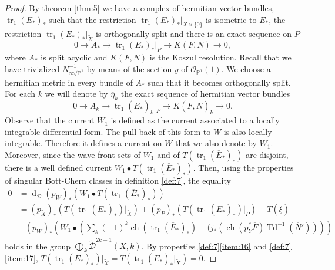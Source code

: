 \documentclass[10pt,twoside]{article}
\numberwithin{equation}{section}
\theoremstyle{plain}
\theoremstyle{definition}
\DeclareMathOperator{\tr}{tr}
\DeclareMathOperator{\Td}{Td}
\DeclareMathOperator{\dd}{d}
\DeclareMathOperator{\ch}{ch}
\begin{document}
\begin{proof}
  By theorem \ref{thm:5} we have a complex of hermitian vector
  bundles, $\tr_{1}(E_{\ast})_{\ast }$ such that the restriction $\tr_{1}(E_{\ast})_{\ast
  }|_{X\times \{0\}}$ is isometric to $E_{\ast }$, the restriction
  $\tr_{1}(E_{\ast})_{\ast 
  }|_{\widetilde X}$ is orthogonally split and there is an exact
  sequence on $P$
  \begin{displaymath}
    0\longrightarrow A_{\ast }\longrightarrow \tr_{1}(E_{\ast})_{\ast
  }|_{P} \longrightarrow K(F,N)\longrightarrow 0, 
  \end{displaymath}
  where $A_{\ast}$ is split acyclic and $K(F,N)$ is the Koszul
  resolution. Recall that we have trivialized
  $N^{-1}_{\infty/\mathbb{P}^{1}}$ 
  by means of the section $y$ of $\mathcal{O}_{\mathbb{P}^{1}}(1)$.
  We choose a hermitian
  metric in every bundle of $A_{\ast}$ such that it becomes orthogonally
  split. For each $k$ we will
  denote by $\overline {\eta}_{k}$ the exact sequence of hermitian
  vector bundles
  \begin{equation}\label{eq:33}
     0\longrightarrow \overline A_{k}\longrightarrow \tr_{1}(\overline
     E_{\ast})_{k}|_{P} 
     \longrightarrow K(\overline F,\overline N)_{k}\longrightarrow 0. 
  \end{equation}
  Observe that the current $W_{1}$ is defined as the current
  associated to a locally integrable differential form. The pull-back
  of this form to $W$ is also  locally integrable. Therefore it
  defines a current on $W$ that we also denote by $W_{1}$. Moreover,
  since the wave front sets of $W_{1}$ and of $T(\tr_{1}(\overline E_{\ast})_{\ast})$
  are disjoint, there is a well defined current $W_{1}\bullet
  T(\tr_{1}(\overline E_{\ast})_{\ast})$. 
  Then, using the properties of singular Bott-Chern classes in
  definition \ref{def:7}, the equality 
  \begin{align*}
    0&=\dd_{\mathcal{D}}
    (p_{W})_{\ast}\left(W_{1} \bullet T(\tr_{1}(\overline E_{\ast})_{\ast})\right)\\
    &=(p_{\widetilde X})_{\ast}(T(\tr_{1}(\overline
    E_{\ast})_{\ast})|_{\widetilde 
      X})+(p_{P})_{\ast}(T(\tr_{1}(\overline E_{\ast})_{\ast})|_{P})-T(\overline \xi)\\
    &-(p_{W})_{\ast}\left(W_{1} \bullet
      \left(\sum_{k}(-1)^{k}\ch(\tr_{1}(\overline E_{\ast})_{\ast})- 
        (j_{\ast}(\ch(p_{Y}^{\ast}\overline F)\Td^{-1}(\overline N'))
      \right)\right)
  \end{align*}
  holds 
  in the group
  $\bigoplus_{k}\widetilde{\mathcal{D}}^{2k-1}(X,k)$.
  By properties   \ref{def:7}\ref{item:16} and
  \ref{def:7}\ref{item:17}, $T(\tr_{1}(\overline 
  E_{\ast})_{\ast})|_{\widetilde 
    X}=T(\tr_{1}(\overline 
  E_{\ast})_{\ast}|_{\widetilde 
    X})=0$. 
    

\end{proof}
\end{document}
